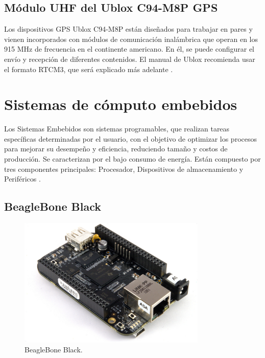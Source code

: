 \subsection{Módulo UHF del Ublox C94-M8P GPS}

Los dispositivos GPS Ublox C94-M8P están diseñados para trabajar en pares y vienen incorporados con módulos de comunicación inalámbrica que operan en los 915 MHz de frecuencia en el continente americano. En él, se puede configurar el envío y recepción de diferentes contenidos. El manual de Ublox recomienda usar el formato RTCM3, que será explicado más adelante \citep{ubloxc94}.

\section{Sistemas de cómputo embebidos}

Los Sistemas Embebidos son sistemas programables, que realizan tareas específicas determinadas por el usuario, con el objetivo de optimizar los procesos para mejorar su desempeño y eficiencia, reduciendo tamaño y costos de producción. Se caracterizan por el bajo consumo de energía. Están compuesto por tres componentes principales: Procesador, Dispositivos de almacenamiento y Periféricos \citep{caballero2014desarrollo}.

\subsection{BeagleBone Black}

\begin{figure}[ht]
\centering
\includegraphics[width=0.8\textwidth]{Figures/BeagleBoneBlack}
\caption[BeagleBone Black.]{BeagleBone Black\footnotemark.}
\label{fig:BBlack}
\end{figure}

